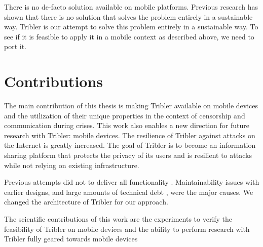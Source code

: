There is no de-facto solution available on mobile platforms. \cite{literature_survey}
Previous research has shown that there is no solution that solves the problem entirely in a sustainable way.
Tribler is our attempt to solve this problem entirely in a sustainable way.
To see if it is feasible to apply it in a mobile context as described above, we need to port it.


\section{Contributions}
The main contribution of this thesis is making Tribler available on mobile devices and the utilization of their unique properties in the context of censorship and communication during crises.
This work also enables a new direction for future research with Tribler: mobile devices.
The resilience of Tribler against attacks on the Internet is greatly increased.
The goal of Tribler is to become an information sharing platform that protects the privacy of its users and is resilient to attacks while not relying on existing infrastructure.

Previous attempts did not to deliver all functionality \cite{tribler2014play,tribler2014at3,tribler-anon-hd}.
Maintainability issues with earlier designs, and large amounts of technical debt \cite{thesis_martijn}, were the major causes.
We changed the architecture of Tribler for our approach.

The scientific contributions of this work are the experiments to verify the feasibility of Tribler on mobile devices and the ability to perform research with Tribler fully geared towards mobile devices


